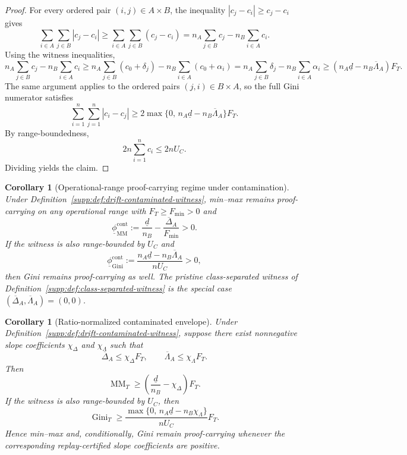 \documentclass[11pt]{article}
\newcommand{\1}{\mathbf{1}}
\newcommand{\Gini}{\operatorname{Gini}}
\newcommand{\MM}{\operatorname{MM}}
\theoremstyle{definition}
\theoremstyle{plain}
\newtheorem{corollary}[definition]{Corollary}
\theoremstyle{remark}
\begin{document}
\begin{proof}
For every ordered pair $(i,j)\in A\times B$, the inequality $|c_j-c_i|\ge c_j-c_i$ gives
\[
\sum_{i\in A}\sum_{j\in B}|c_j-c_i|
\ge
\sum_{i\in A}\sum_{j\in B}(c_j-c_i)
=
 n_A\sum_{j\in B}c_j - n_B\sum_{i\in A}c_i.
\]
Using the witness inequalities,
\[
 n_A\sum_{j\in B}c_j - n_B\sum_{i\in A}c_i
\ge
 n_A\sum_{j\in B}(c_0+\delta_j) - n_B\sum_{i\in A}(c_0+\alpha_i)
=
 n_A\sum_{j\in B}\delta_j - n_B\sum_{i\in A}\alpha_i
\ge
 (n_A\underline d - n_B\overline\Lambda_A)F_T.
\]
The same argument applies to the ordered pairs $(j,i)\in B\times A$, so the full Gini numerator satisfies
\[
\sum_{i=1}^n\sum_{j=1}^n |c_i-c_j|
\ge
2\max\{0,\,n_A\underline d - n_B\overline\Lambda_A\}F_T.
\]
By range-boundedness,
\[
2n\sum_{i=1}^n c_i \le 2nU_C.
\]
Dividing yields the claim.
\end{proof}

\begin{corollary}[Operational-range proof-carrying regime under contamination]
\label{supp:cor:contaminated-proof-carrying}
Under Definition~\ref{supp:def:drift-contaminated-witness}, min--max remains proof-carrying on any operational range with $F_T\ge F_{\min}>0$ and
\[
\underline\phi_{\MM}^{\mathrm{cont}}
:=
\frac{\underline d}{n_B} - \frac{\overline\Delta_A}{F_{\min}} > 0.
\]
If the witness is also range-bounded by $U_C$ and
\[
\underline\phi_{\Gini}^{\mathrm{cont}}
:=
\frac{n_A\underline d - n_B\overline\Lambda_A}{nU_C} > 0,
\]
then Gini remains proof-carrying as well. The pristine class-separated witness of Definition~\ref{supp:def:class-separated-witness} is the special case $(\overline\Delta_A,\overline\Lambda_A)=(0,0)$.
\end{corollary}

\begin{corollary}[Ratio-normalized contaminated envelope]
\label{supp:cor:ratio-normalized-contaminated}
Under Definition~\ref{supp:def:drift-contaminated-witness}, suppose there exist nonnegative slope coefficients $\chi_\Delta$ and $\chi_\Lambda$ such that
\[
\overline\Delta_A \le \chi_\Delta F_T,
\qquad
\overline\Lambda_A \le \chi_\Lambda F_T.
\]
Then
\[
\MM_T \ge \left(\frac{\underline d}{n_B}-\chi_\Delta\right)F_T.
\]
If the witness is also range-bounded by $U_C$, then
\[
\Gini_T \ge \frac{\max\{0,\,n_A\underline d - n_B\chi_\Lambda\}}{nU_C}F_T.
\]
Hence min--max and, conditionally, Gini remain proof-carrying whenever the corresponding replay-certified slope coefficients are positive.
\end{corollary}
\end{document}
